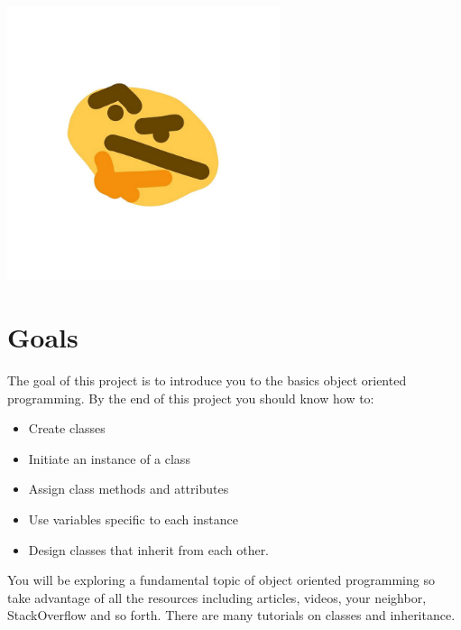 \documentclass{42-en}
\begin{document}
	\begin{center}
		\includegraphics[width=0.6\textwidth]{images/thonking.jpg}
	\end{center}

\chapter{Goals}

	The goal of this project is to introduce you to the basics object oriented programming.
	By the end of this project you should know how to:\\
	
	\begin{itemize}
		\item Create classes
		\item Initiate an instance of a class
		\item Assign class methods and attributes
		\item Use variables specific to each instance
		\item Design classes that inherit from each other.
	\end{itemize}
	 
	You will be exploring a fundamental topic of object oriented programming
	so take advantage of all the resources including articles, videos, your neighbor, StackOverflow and so forth. There are many tutorials on classes and inheritance.
\end{document}
